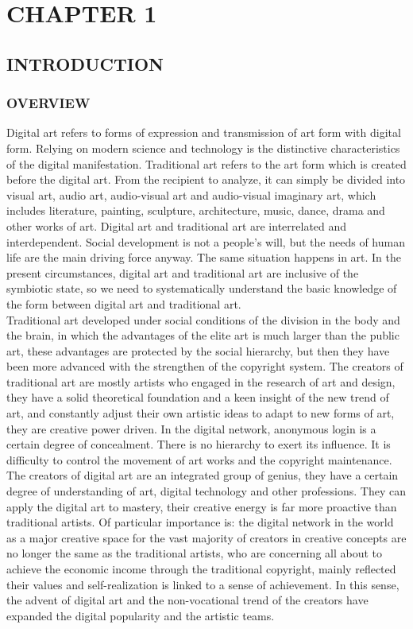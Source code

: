 
\chapter{CHAPTER 1}


\section{INTRODUCTION}


\subsection{OVERVIEW}
Digital art refers to forms of expression and transmission of art form with digital form. Relying on modern science and technology is the distinctive characteristics of the digital manifestation. Traditional art refers to the art form which is created before the digital art. From the recipient to analyze, it can simply be divided into visual art, audio art, audio-visual art and audio-visual imaginary art, which includes literature, painting, sculpture, architecture, music, dance, drama and other works of art. Digital art and traditional art are interrelated and interdependent. Social development is not a people's will, but the needs of human life are the main driving force anyway. The same situation happens in art. In the present circumstances, digital art and traditional art are inclusive of the symbiotic state, so we need to systematically understand the basic knowledge of the form between digital art and traditional art.\\
Traditional art developed under social conditions of the division in the body and the brain, in which the advantages of the elite art is much larger than the public art, these advantages are protected by the social hierarchy, but then they have been more advanced with the strengthen of the copyright system. The creators of traditional art are mostly artists who engaged in the research of art and design, they have a solid theoretical foundation and a keen insight of the new trend of art, and constantly adjust their own artistic ideas to adapt to new forms of art, they are creative power driven. In the digital network, anonymous login is a certain
degree of concealment. There is no hierarchy to exert its influence. It is difficulty to control the movement of art works and the copyright maintenance. The creators of digital art are an integrated group of genius, they have a certain degree of understanding of art, digital technology and other professions. They can apply the digital art to mastery, their creative energy is far more proactive than traditional artists. Of particular importance is: the digital network in the world as a major creative space for the vast majority of creators in creative concepts are no longer the same as the traditional artists, who are concerning all about to achieve the economic income through the traditional copyright, mainly reflected their values and self-realization is linked to a sense of achievement. In this sense, the advent of digital art and the non-vocational trend of the creators have expanded the digital popularity and the artistic teams.\\
